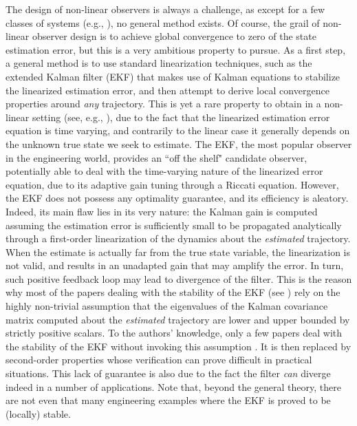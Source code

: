 \documentclass[a4paper,12pt,onecolumn]{article}
\begin{document}
The design of non-linear observers is always a challenge, as except for a few classes of systems  (e.g.,  \cite{Gauthier-Kupka-book01}), no general method exists. Of course, the grail of non-linear observer design is to achieve global convergence  to zero of the state estimation error, but this is a very ambitious property to pursue. As a first step, a general method is to use standard linearization techniques, such as the extended Kalman filter (EKF) that makes use of Kalman equations to stabilize the linearized estimation error, and then attempt to derive local convergence properties around \emph{any} trajectory. This is yet a rare property to obtain in a non-linear setting (see, e.g., \cite{aghannan-rouchon-ieee03}), due to the fact that the linearized estimation error equation is time varying, and contrarily to the linear case it generally depends on the unknown true state we seek to estimate.  The EKF,  the most popular observer in the engineering world, provides an ``off the shelf" candidate observer, potentially able to deal with the time-varying nature of the linearized error equation, due to its adaptive gain tuning through a Riccati equation.  However, the EKF does not possess any optimality guarantee, and its efficiency is aleatory. Indeed, its main flaw lies in its very nature: the Kalman gain is computed assuming the estimation error is sufficiently small to be propagated analytically through a first-order linearization of the dynamics about the \emph{estimated} trajectory. When the estimate is actually far from the true state variable, the linearization is not valid, and results in an unadapted gain that may amplify the error. In turn, such positive feedback loop may lead to divergence of the filter. This is the reason why most of the papers dealing with the stability of the EKF (see \cite{boutayeb,song-grizzle-95,reif,bonnabel2012contraction}) rely on the highly non-trivial assumption that the eigenvalues of the Kalman covariance matrix  computed about the \emph{estimated} trajectory are lower and upper bounded by strictly positive scalars.  To the authors' knowledge, only a few papers deal with the stability of the EKF without invoking this assumption \cite{krener2003convergence}. It is then replaced by second-order properties whose verification can prove difficult in practical situations. This lack of guarantee is also due to the fact the filter \emph{can} diverge indeed in a number of applications. Note that,  beyond the general theory, there are not even that many engineering examples where the EKF is proved to be (locally) stable. 
\end{document}

